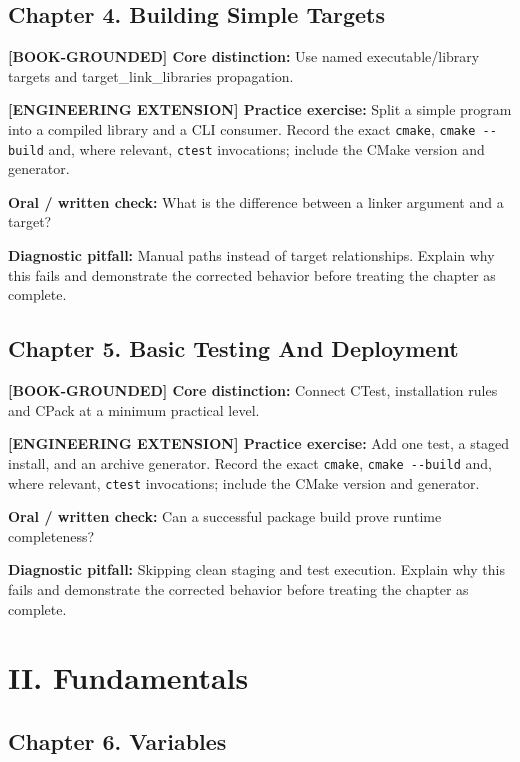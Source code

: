 \documentclass[11pt,letterpaper,oneside]{report}
\providecommand{\passthrough}[1]{#1}
\begin{document}
\section{Chapter 4. Building Simple
Targets}\label{chapter-4.-building-simple-targets}

\textbf{{[}BOOK-GROUNDED{]} Core distinction:} Use named
executable/library targets and target\_link\_libraries propagation.

\textbf{{[}ENGINEERING EXTENSION{]} Practice exercise:} Split a simple
program into a compiled library and a CLI consumer. Record the exact
\passthrough{\lstinline!cmake!}, \passthrough{\lstinline!cmake --build!}
and, where relevant, \passthrough{\lstinline!ctest!} invocations;
include the CMake version and generator.

\textbf{Oral / written check:} What is the difference between a linker
argument and a target?

\textbf{Diagnostic pitfall:} Manual paths instead of target
relationships. Explain why this fails and demonstrate the corrected
behavior before treating the chapter as complete.

\section{Chapter 5. Basic Testing And
Deployment}\label{chapter-5.-basic-testing-and-deployment}

\textbf{{[}BOOK-GROUNDED{]} Core distinction:} Connect CTest,
installation rules and CPack at a minimum practical level.

\textbf{{[}ENGINEERING EXTENSION{]} Practice exercise:} Add one test, a
staged install, and an archive generator. Record the exact
\passthrough{\lstinline!cmake!}, \passthrough{\lstinline!cmake --build!}
and, where relevant, \passthrough{\lstinline!ctest!} invocations;
include the CMake version and generator.

\textbf{Oral / written check:} Can a successful package build prove
runtime completeness?

\textbf{Diagnostic pitfall:} Skipping clean staging and test execution.
Explain why this fails and demonstrate the corrected behavior before
treating the chapter as complete.

\chapter{II. Fundamentals}\label{ii.-fundamentals}

\section{Chapter 6. Variables}\label{chapter-6.-variables}
\end{document}
